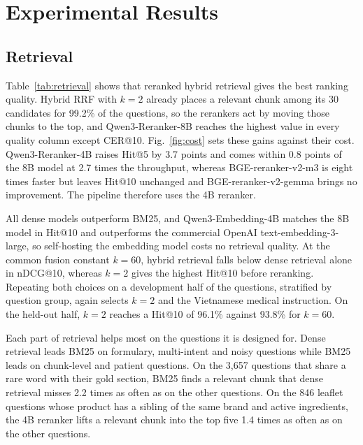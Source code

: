 \section{Experimental Results}\label{sec:results}
\suppressfloats[t]

\subsection{Retrieval}\label{sec:results-retrieval}




Table~\ref{tab:retrieval} shows that reranked hybrid retrieval gives the best ranking quality. Hybrid RRF with $k=2$ already places a relevant chunk among its 30 candidates for 99.2\% of the questions, so the rerankers act by moving those chunks to the top, and Qwen3-Reranker-8B reaches the highest value in every quality column except CER@10. Fig.~\ref{fig:cost} sets these gains against their cost. Qwen3-Reranker-4B raises Hit@5 by 3.7 points and comes within 0.8 points of the 8B model at 2.7 times the throughput, whereas BGE-reranker-v2-m3 is eight times faster but leaves Hit@10 unchanged and BGE-reranker-v2-gemma brings no improvement. The pipeline therefore uses the 4B reranker.

All dense models outperform BM25, and Qwen3-Embedding-4B matches the 8B model in Hit@10 and outperforms the commercial OpenAI text-embedding-3-large, so self-hosting the embedding model costs no retrieval quality. At the common fusion constant $k=60$, hybrid retrieval falls below dense retrieval alone in nDCG@10, whereas $k=2$ gives the highest Hit@10 before reranking. Repeating both choices on a development half of the questions, stratified by question group, again selects $k=2$ and the Vietnamese medical instruction. On the held-out half, $k=2$ reaches a Hit@10 of 96.1\% against 93.8\% for $k=60$.

Each part of retrieval helps most on the questions it is designed for. Dense retrieval leads BM25 on formulary, multi-intent and noisy questions while BM25 leads on chunk-level and patient questions. On the 3{,}657 questions that share a rare word with their gold section, BM25 finds a relevant chunk that dense retrieval misses 2.2 times as often as on the other questions. On the 846 leaflet questions whose product has a sibling of the same brand and active ingredients, the 4B reranker lifts a relevant chunk into the top five 1.4 times as often as on the other questions.

